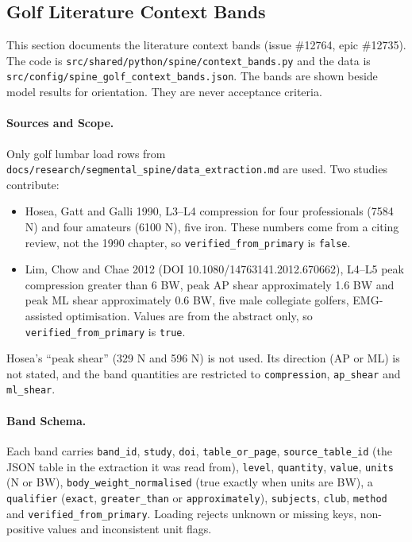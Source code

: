 \subsection{Golf Literature Context Bands}
\label{sec:spn-11b}

This section documents the literature context bands (issue \#12764, epic
\#12735). The code is \texttt{src/shared/python/spine/context\_bands.py} and the
data is \texttt{src/config/spine\_golf\_context\_bands.json}. The bands are
shown beside model results for orientation. They are never acceptance criteria.

\paragraph{Sources and Scope.}
Only golf lumbar load rows from \texttt{docs/research/segmental\_spine/data\_extraction.md}
are used. Two studies contribute:
\begin{itemize}
  \item Hosea, Gatt and Galli 1990, L3--L4 compression for four professionals
        (7584 N) and four amateurs (6100 N), five iron. These numbers come from a
        citing review, not the 1990 chapter, so \texttt{verified\_from\_primary}
        is \texttt{false}.
  \item Lim, Chow and Chae 2012 (DOI 10.1080/14763141.2012.670662), L4--L5 peak
        compression greater than 6 BW, peak AP shear approximately 1.6 BW and peak
        ML shear approximately 0.6 BW, five male collegiate golfers, EMG-assisted
        optimisation. Values are from the abstract only, so
        \texttt{verified\_from\_primary} is \texttt{true}.
\end{itemize}
Hosea's ``peak shear'' (329 N and 596 N) is not used. Its direction (AP or ML) is
not stated, and the band quantities are restricted to \texttt{compression},
\texttt{ap\_shear} and \texttt{ml\_shear}.

\paragraph{Band Schema.}
Each band carries \texttt{band\_id}, \texttt{study}, \texttt{doi}, \texttt{table\_or\_page},
\texttt{source\_table\_id} (the JSON table in the extraction it was read from),
\texttt{level}, \texttt{quantity}, \texttt{value}, \texttt{units} (N or BW),
\texttt{body\_weight\_normalised} (true exactly when units are BW), a
\texttt{qualifier} (\texttt{exact}, \texttt{greater\_than} or \texttt{approximately}),
\texttt{subjects}, \texttt{club}, \texttt{method} and \texttt{verified\_from\_primary}.
Loading rejects unknown or missing keys, non-positive values and inconsistent unit
flags.

